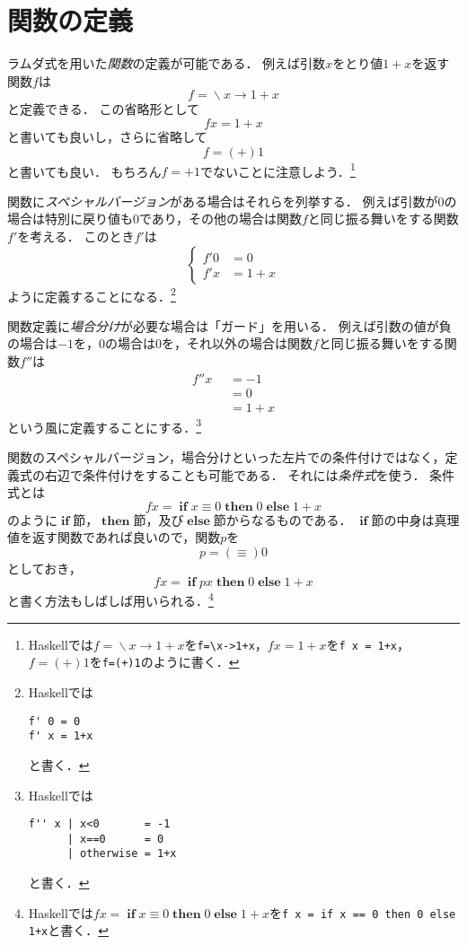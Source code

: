 \documentclass[twocolumn]{jsbook}
\newcommand{\keyword}[1]{\emph{#1}}
\newcommand{\code}[1]{\texttt{#1}}
\newcommand{\mathKeyword}[1]{\mathbf{#1}}
\DeclareMathOperator{\mathElse}{\mathKeyword{else}}
\DeclareMathOperator{\mathIf}{\mathKeyword{if}}
\DeclareMathOperator{\mathLambda}{\backslash}
\DeclareMathOperator{\mathThen}{\mathKeyword{then}}
\newcommand{\mathLambdaArrow}{\rightarrow}
\newcommand{\mathOtherwise}{\mathKeyword{otherwise}}
\newcommand{\mathGuard}[1]{\mathop{\mid_{#1}}}
\newcommand{\mathLambdaExpression}[2]{\mathLambda#1\mathLambdaArrow#2}
\begin{document}
\section{関数の定義}

ラムダ式を用いた\keyword{関数}の定義が可能である．
例えば引数$x$をとり値$1+x$を返す関数$f$は$$f=\mathLambdaExpression{x}{1+x}$$と定義できる．
この省略形として$$fx=1+x$$と書いても良いし，さらに省略して$$f=(+)1$$と書いても良い．
もちろん$f=+1$でないことに注意しよう．\footnote{Haskellでは$f=\mathLambdaExpression{x}{1+x}$を\code{f=\textbackslash x->1+x}，$fx=1+x$を\code{f x = 1+x}，$f=(+)1$を\code{f=(+)1}のように書く．}

関数に\keyword{スペシャルバージョン}がある場合はそれらを列挙する．
例えば引数が$0$の場合は特別に戻り値も$0$であり，その他の場合は関数$f$と同じ振る舞いをする関数$f'$を考える．
このとき$f'$は
\begin{equation*}
\left\{
\begin{split}
f'0&=0\\
f'x&=1+x
\end{split}
\right.
\end{equation*}
ように定義することになる．\footnote{Haskellでは
\begin{Verbatim}[xleftmargin=10mm]
f' 0 = 0
f' x = 1+x
\end{Verbatim}
と書く．}

関数定義に\keyword{場合分け}が必要な場合は「ガード」を用いる．
例えば引数の値が負の場合は$-1$を，$0$の場合は$0$を，それ以外の場合は関数$f$と同じ振る舞いをする関数$f''$は
\begin{equation*}
\begin{split}
f''x&\mathGuard{x<0}=-1\\
&\mathGuard{x\equiv 0}=0\\
&\mathGuard{\mathOtherwise}=1+x
\end{split}
\end{equation*}
という風に定義することにする．\footnote{Haskellでは
\begin{Verbatim}[xleftmargin=10mm]
f'' x | x<0       = -1
      | x==0      = 0
      | otherwise = 1+x
\end{Verbatim}
と書く．}

関数のスペシャルバージョン，場合分けといった左片での条件付けではなく，定義式の右辺で条件付けをすることも可能である．
それには\keyword{条件式}を使う．
条件式とは
$$fx=\mathIf x\equiv0\mathThen0\mathElse1+x$$
のように$\mathIf$節，$\mathThen$節，及び$\mathElse$節からなるものである．
$\mathIf$節の中身は真理値を返す関数であれば良いので，関数$p$を$$p=(\equiv)0$$としておき，$$fx=\mathIf px\mathThen0\mathElse1+x$$と書く方法もしばしば用いられる．\footnote{Haskellでは$fx=\mathIf x\equiv0\mathThen0\mathElse1+x$を\code{f x = if x == 0 then 0 else 1+x}と書く．}
\end{document}

